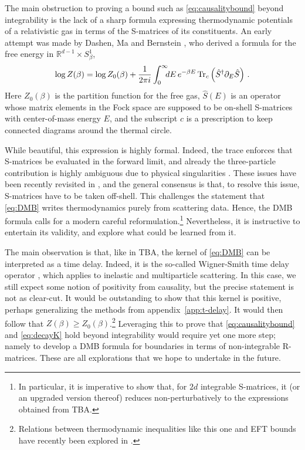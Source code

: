 \documentclass[
 reprint,
 amsmath,
 pre,
 amssymb,
 nofootinbib,
 aps,
 longbibliography,
]{revtex4-1}
\newcommand{\<}{{\langle}}
\renewcommand{\>}{{\rangle}}
\begin{document}
The main obstruction to proving a bound such as \eqref{eq:causalitybound} beyond integrability is the lack of a sharp formula expressing thermodynamic potentials of a relativistic gas in terms of the S-matrices of its constituents. An early attempt was made by Dashen, Ma and Bernstein \cite{Dashen:1969ep,Dashen2}, who derived a formula for the free energy in $\mathbb R^{d-1}\times S^1_\beta$,
\begin{equation}\label{eq:DMB}
    \log Z(\beta) = \log Z_0(\beta) +\frac{1}{2\pi i}\int_0^\infty \hspace{-5pt} dE\, e^{-\beta E}\, \text{Tr}_c\left(\hat S^\dagger \partial_E \hat S\right)\,.
\end{equation}
Here $Z_0(\beta)$ is the partition function for the free gas, $\hat S(E)$ is an operator whose matrix elements in the Fock space are supposed to be on-shell S-matrices with center-of-mass energy $E$, and the subscript $c$ is a prescription to keep connected diagrams around the thermal circle.

While beautiful, this expression is highly formal. Indeed, the trace enforces that S-matrices be evaluated in the forward limit, and already the three-particle contribution
is highly ambiguous due to physical singularities \cite{Coleman:1965xm}. These issues have been recently revisited in \cite{Schubring:2024yfi,Baratella:2024sax,Baratella:2025fcj}, and the general consensus is that, to resolve this issue, S-matrices have to be taken off-shell. This challenges the statement that \eqref{eq:DMB} writes thermodynamics purely from scattering data. Hence, the DMB formula calls for a modern careful reformulation.\footnote{In particular, it is imperative to show that, for $2d$ integrable S-matrices, it (or an upgraded version thereof) reduces non-perturbatively to the expressions obtained from TBA.} Nevertheless, it is instructive to entertain its validity, and explore what could be learned from it.

The main observation is that, like in TBA, the kernel of \eqref{eq:DMB} can be interpreted as a time delay. Indeed, it is the so-called Wigner-Smith time delay operator \cite{Smith:1960zza,Martin:1976iw}, which applies to inelastic and multiparticle scattering. In this case, we still expect some notion of positivity from causality, but the precise statement is not as clear-cut. It would be outstanding to show that this kernel is positive, perhaps generalizing the methods from appendix~\ref{app:t-delay}. It would then follow that $Z(\beta)\geq Z_0(\beta)$.\footnote{Relations between thermodynamic inequalities like this one and EFT bounds have recently been explored in \cite{Fernandez-Sarmiento:2025tpy}.} Leveraging this to prove that \eqref{eq:causalitybound} and \eqref{eq:decayK} hold beyond integrability would require yet one more step; namely to develop a DMB formula for boundaries in terms of non-integrable R-matrices. These are all explorations that we hope to undertake in the future.
\end{document}
